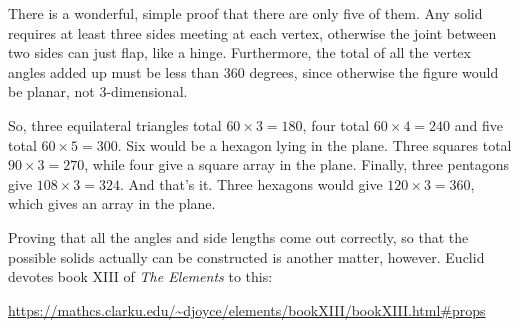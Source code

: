 \documentclass[11pt, oneside]{article}
\begin{document}
There is a wonderful, simple proof that there are only five of them.  Any solid requires at least three sides meeting at each vertex, otherwise the joint between two sides can just flap, like a hinge.  Furthermore, the total of all the vertex angles added up must be less than $360$ degrees, since otherwise the figure would be planar, not 3-dimensional.

So, three equilateral triangles total $60 \times 3 = 180$, four total $60 \times 4 = 240$ and five total $60 \times 5 = 300$.  Six would be a hexagon lying in the plane.  Three squares total $90 \times 3 = 270$, while four give a square array in the plane.  Finally, three pentagons give $108 \times 3 = 324$.  And that's it.  Three hexagons would give $120 \times 3 = 360$, which gives an array in the plane.

Proving that all the angles and side lengths come out correctly, so that the possible solids actually can be constructed is another matter, however.  Euclid devotes book XIII of \emph{The Elements} to this:

\url{https://mathcs.clarku.edu/~djoyce/elements/bookXIII/bookXIII.html#props}
\end{document}
